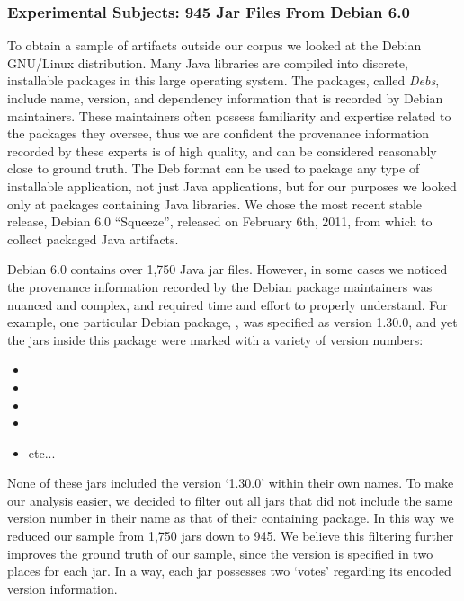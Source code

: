 \subsubsection{Experimental Subjects:  945 Jar Files From Debian 6.0}

To obtain a sample of artifacts outside our corpus we looked at the Debian
GNU/Linux distribution.  Many Java libraries are compiled into discrete,
installable packages in this large operating system.  The packages, called
\emph{Debs}, include name, version, and dependency information that is
recorded by Debian maintainers.  These maintainers often possess
familiarity and expertise related to the packages they oversee, thus we are
confident the provenance information recorded by these experts is of high
quality, and can be considered reasonably close to ground truth.  The Deb
format can be used to package any type of installable application, not just
Java applications, but for our purposes we looked only at packages
containing Java libraries.  We chose the most recent stable release, Debian
6.0 ``Squeeze'', released on February 6th, 2011, from which to collect
packaged Java artifacts.

Debian 6.0 contains over 1,750 Java jar files.  However, in some cases we
noticed the provenance information recorded by the Debian package
maintainers was nuanced and complex, and required time and effort to
properly understand.  For example, one particular Debian package,
, was specified as version 1.30.0, and yet
the jars inside this package were marked with a variety of version numbers:

\begin{itemize}

    \item {}
    \item {}
    \item {}
    \item {}
    \item etc...

\end{itemize}

None of these jars included the version `1.30.0' within their own names.
To make our analysis easier, we decided to filter out all jars that did not
include the same version number in their name as that of their containing
package.  In this way we reduced our sample from 1,750 jars down to 945.
We believe this filtering further improves the ground
truth of our sample, since the version is specified in two places for each
jar.  In a way, each jar possesses two `votes' regarding its encoded
version information.


